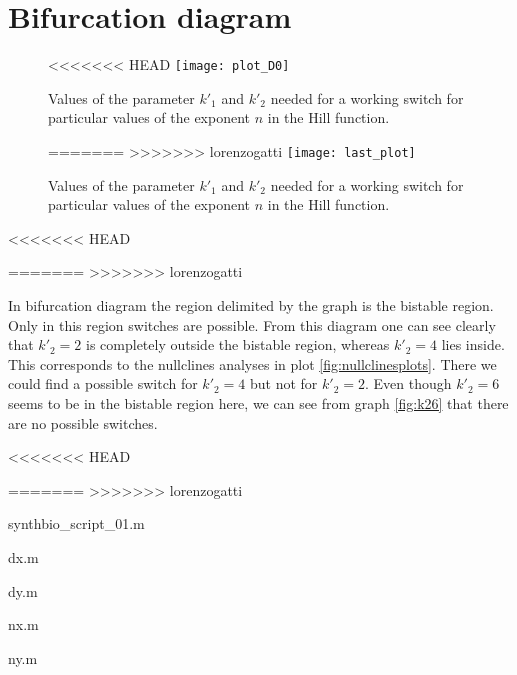 \section{Bifurcation diagram}


\begin{figure}[h]
<<<<<<< HEAD
  	\centering
    \texttt{[image: plot\_D0]}
    \caption{Values of the parameter $k'_1$ and $k'_2$ needed for a working switch
 	for particular values of the exponent $n$ in the Hill function. }
=======
>>>>>>> lorenzogatti
 \centering
    \texttt{[image: last\_plot]}
    \caption{Values of the parameter $k'_1$ and $k'_2$ needed for a working
    switch
for particular values of the exponent $n$ in the Hill function.}
	\label{fig:bifurcatingplot}
\end{figure}
<<<<<<< HEAD

=======
>>>>>>> lorenzogatti
 
 
 In bifurcation diagram the region delimited by the graph is the bistable
 region. Only in this region switches are possible. From this diagram one can
 see clearly that $k'_2 = 2$ is completely outside the bistable region,
 whereas $k'_2 = 4$ lies inside. This corresponds to the nullclines analyses in
 plot \ref{fig:nullclinesplots}. There we could find a possible switch for $k'_2=4$ but not
 for $k'_2 = 2$. Even though $k'_2 = 6$ seems to be in the bistable region here,
 we can see from graph \ref{fig:k26} that there are no possible switches.

\newpage

<<<<<<< HEAD





=======
>>>>>>> lorenzogatti
\begin{section}{synthbio\_script\_01.m}

\end{section}
\begin{section}{dx.m}

\end{section}
\begin{section}{dy.m}

\end{section}
\begin{section}{nx.m}

\end{section}
\begin{section}{ny.m}

\end{section}
